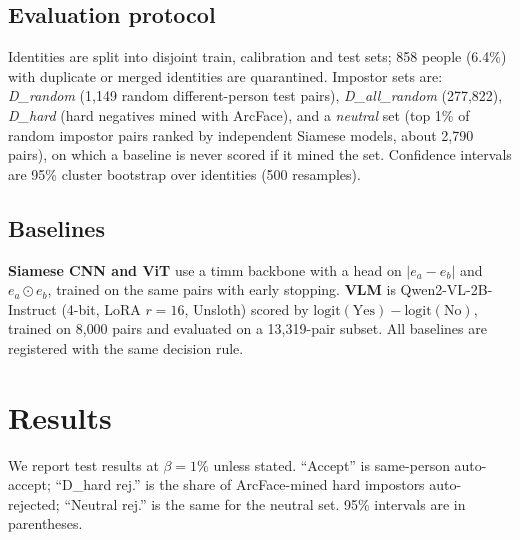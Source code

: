 \documentclass[10pt, a4paper, twocolumn]{article}
\begin{document}
\subsection{Evaluation protocol}
Identities are split into disjoint train, calibration and test sets; 858 people (6.4\%) with duplicate or merged identities are quarantined. Impostor sets are: \emph{D\_random} (1{,}149 random different-person test pairs), \emph{D\_all\_random} (277{,}822), \emph{D\_hard} (hard negatives mined with ArcFace), and a \emph{neutral} set (top 1\% of random impostor pairs ranked by independent Siamese models, about 2{,}790 pairs), on which a baseline is never scored if it mined the set. Confidence intervals are 95\% cluster bootstrap over identities (500 resamples).

\subsection{Baselines}
\textbf{Siamese CNN and ViT} use a timm backbone with a head on $|e_a-e_b|$ and $e_a\odot e_b$, trained on the same pairs with early stopping. \textbf{VLM} is Qwen2-VL-2B-Instruct (4-bit, LoRA $r=16$, Unsloth) scored by $\mathrm{logit}(\text{Yes})-\mathrm{logit}(\text{No})$, trained on 8{,}000 pairs and evaluated on a 13{,}319-pair subset. All baselines are registered with the same decision rule.

\section{Results}
We report test results at $\beta=1\%$ unless stated. ``Accept'' is same-person auto-accept; ``D\_hard rej.'' is the share of ArcFace-mined hard impostors auto-rejected; ``Neutral rej.'' is the same for the neutral set. 95\% intervals are in parentheses.
\end{document}
